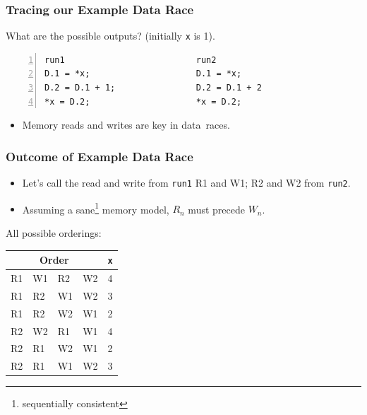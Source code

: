\documentclass[aspectratio=43]{beamer}
\newenvironment{changemargin}[1]{%
  \begin{list}{}{%
    \setlength{\topsep}{0pt}%
    \setlength{\leftmargin}{#1}%
    \setlength{\rightmargin}{1em}
    \setlength{\listparindent}{\parindent}%
    \setlength{\itemindent}{\parindent}%
    \setlength{\parsep}{\parskip}%
  }%
  \item[]}{\end{list}}
\begin{document}
\begin{frame}[fragile]
  \frametitle{Tracing our Example Data Race}

  \begin{changemargin}{2.5cm}
   What are the possible outputs? (initially {\tt *x} is 1).

  \begin{lstlisting}[numbers=left]
run1                          run2   
D.1 = *x;                     D.1 = *x;
D.2 = D.1 + 1;                D.2 = D.1 + 2
*x = D.2;                     *x = D.2;
  \end{lstlisting}

  \begin{itemize}
    \item Memory reads and writes are key in data~races.
  \end{itemize}
  \end{changemargin}

\end{frame}

\begin{frame}
  \frametitle{Outcome of Example Data Race}

  \begin{changemargin}{2cm}
  \begin{itemize}
    \item Let's call the read and write from {\tt run1} R1 and W1; R2 and W2
      from {\tt run2}.
    \item Assuming a sane\footnote{sequentially consistent} memory model, $R_n$ must precede $W_n$.
  \end{itemize}
  \vfill
  All possible orderings:
  \begin{center}
    \begin{tabular}{llll|l}
\multicolumn{4}{c|}{Order} & {\tt *x}\\
\hline
R1 & W1 & R2 & W2 & 4 \\
R1 & R2 & W1 & W2 & 3 \\
R1 & R2 & W2 & W1 & 2 \\
R2 & W2 & R1 & W1 & 4 \\
R2 & R1 & W2 & W1 & 2 \\
R2 & R1 & W1 & W2 & 3 \\
    \end{tabular}
  \end{center}
  \end{changemargin}

\end{frame}
\end{document}
